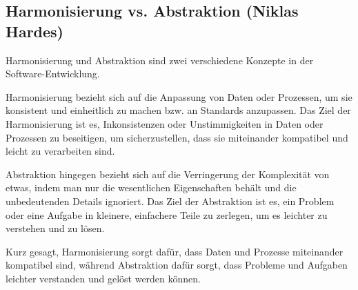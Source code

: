 
\subsection*{Harmonisierung vs. Abstraktion (Niklas Hardes)}

Harmonisierung und Abstraktion sind zwei verschiedene Konzepte in der Software-Entwicklung.

Harmonisierung bezieht sich auf die Anpassung von Daten oder Prozessen, um sie konsistent und einheitlich zu machen bzw. an Standards anzupassen. Das Ziel der Harmonisierung ist es, Inkonsistenzen oder Unstimmigkeiten in Daten oder Prozessen zu beseitigen, um sicherzustellen, dass sie miteinander kompatibel und leicht zu verarbeiten sind.

Abstraktion hingegen bezieht sich auf die Verringerung der Komplexität von etwas, indem man nur die wesentlichen Eigenschaften behält und die unbedeutenden Details ignoriert. Das Ziel der Abstraktion ist es, ein Problem oder eine Aufgabe in kleinere, einfachere Teile zu zerlegen, um es leichter zu verstehen und zu lösen.

Kurz gesagt, Harmonisierung sorgt dafür, dass Daten und Prozesse miteinander kompatibel sind, während Abstraktion dafür sorgt, dass Probleme und Aufgaben leichter verstanden und gelöst werden können.